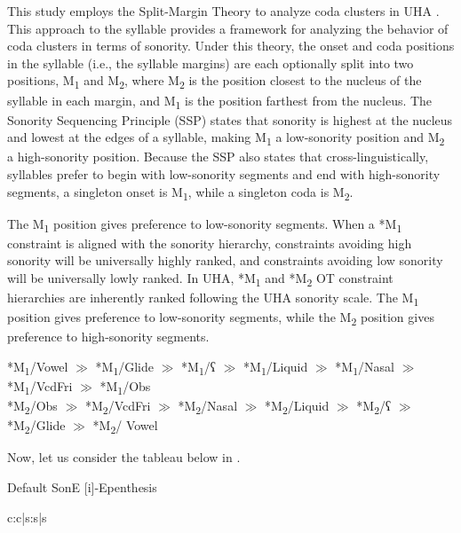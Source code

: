 \documentclass[output=paper,colorlinks,citecolor=brown]{langscibook}
\begin{document}
This study employs the Split-Margin Theory to analyze coda clusters in UHA \citep{Baertsch2002, BaertschDavis2009}. This approach to the syllable provides a framework for analyzing the behavior of coda clusters in terms of sonority.  Under this theory, the onset and coda positions in the syllable (i.e., the syllable margins) are each optionally split into two positions, M\textsubscript{1} and M\textsubscript{2}, where M\textsubscript{2} is the position closest to the nucleus of the syllable in each margin, and M\textsubscript{1} is the position farthest from the nucleus.  The Sonority Sequencing Principle (SSP) states that sonority is highest at the nucleus and lowest at the edges of a syllable, making M\textsubscript{1} a low-sonority position and M\textsubscript{2} a high-sonority position.  Because the SSP also states that cross-linguistically, syllables prefer to begin with low-sonority segments and end with high-sonority segments, a singleton onset is M\textsubscript{1}, while a singleton coda is M\textsubscript{2}.

The M\textsubscript{1} position gives preference to low-sonority segments. When a *M\textsubscript{1} constraint is aligned with the sonority hierarchy, constraints avoiding high sonority will be universally highly ranked, and constraints avoiding low sonority will be universally lowly ranked. In UHA, *M\textsubscript{1} and *M\textsubscript{2} OT constraint hierarchies are inherently ranked following the UHA sonority scale. The M\textsubscript{1} position gives preference to low-sonority segments, while the M\textsubscript{2} position gives preference to high-sonority segments.

\begin{exe} 
		\ex \label{m1} *M\textsubscript{1}/Vowel $\gg$ *M\textsubscript{1}/Glide $\gg$ *M\textsubscript{1}/ʕ $\gg$ *M\textsubscript{1}/Liquid $\gg$ *M\textsubscript{1}/Nasal $\gg$ *M\textsubscript{1}/VcdFri $\gg$ *M\textsubscript{1}/Obs\\
  *M\textsubscript{2}/Obs $\gg$ *M\textsubscript{2}/VcdFri $\gg$ *M\textsubscript{2}/Nasal $\gg$ *M\textsubscript{2}/Liquid $\gg$ *M\textsubscript{2}/ʕ $\gg$    *M\textsubscript{2}/Glide $\gg$ *M\textsubscript{2}/ Vowel
\end{exe}

Now, let us consider the tableau below in . 

\begin{table}
\caption{Default SonE [i]-Epenthesis}
\label{defsonep}
\begin{center}
\ShadingOn
\begin{tableau}{c:c|s:s|s} 
            
\cand[\Optimal]{[la.kim]}   \vio{}     \vio{}  \vio{*} \vio{*} \vio{}
\cand{[la.kam]}             \vio{*!}   \vio{}  \vio{*} \vio{}  \vio{*}
\cand{[la.kum]}             \vio{}    \vio{*!} \vio{*}  \vio{}  \vio{}
\end{tableau}
\end{center}
\end{table}
\end{document}
